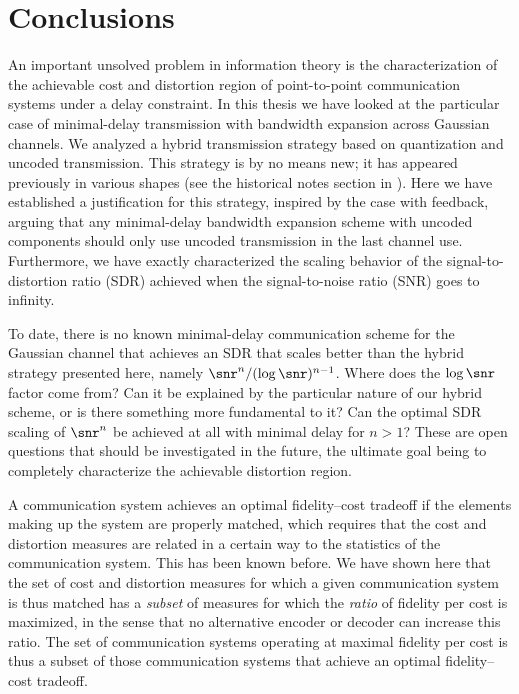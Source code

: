 \chapter{Conclusions}\label{ch:conclusions}

An important unsolved problem in information theory is the characterization of
the achievable cost and distortion region of point-to-point communication
systems under a delay constraint. In this thesis we have looked at the
particular case of minimal-delay transmission with bandwidth expansion across
Gaussian channels. We analyzed a hybrid transmission strategy based on
quantization and uncoded transmission. This strategy is by no means new; it has
appeared previously in various shapes (see the historical notes section in
). Here we have established a justification for this
strategy, inspired by the case with feedback, arguing that any minimal-delay
bandwidth expansion scheme with uncoded components should only use uncoded
transmission in the last channel use. Furthermore, we have exactly characterized
the scaling behavior of the signal-to-distortion ratio (SDR) achieved when the
signal-to-noise ratio (SNR) goes to infinity. 

To date, there is no known minimal-delay communication scheme for the Gaussian
channel that achieves an SDR that scales better than the hybrid strategy
presented here, namely $\snr^n / (\log\snr)^{n-1}$. Where does the $\log\snr$
factor come from? Can it be explained by the particular nature of our hybrid
scheme, or is there something more fundamental to it? Can the optimal SDR
scaling of $\snr^n$ be achieved at all with minimal delay for $n > 1$? These are
open questions that should be investigated in the future, the ultimate goal
being to completely characterize the achievable distortion region. 

\medbreak

A communication system achieves an optimal fidelity--cost tradeoff if the
elements making up the system are properly matched, which requires that the cost
and distortion measures are related in a certain way to the statistics of the
communication system. This has been known before.  We have shown here that the
set of cost and distortion measures for which a given communication system is
thus matched has a \emph{subset} of measures for which the \emph{ratio} of
fidelity per cost is maximized, in the sense that no alternative encoder or
decoder can increase this ratio. The set of communication systems operating at
maximal fidelity per cost is thus a subset of those communication systems that
achieve an optimal fidelity--cost tradeoff.


